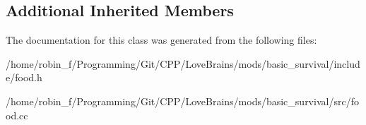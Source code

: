 \subsection*{Additional Inherited Members}


The documentation for this class was generated from the following files\+:\begin{DoxyCompactItemize}
\item 
/home/robin\+\_\+f/\+Programming/\+Git/\+C\+P\+P/\+Love\+Brains/mods/basic\+\_\+survival/include/food.\+h\item 
/home/robin\+\_\+f/\+Programming/\+Git/\+C\+P\+P/\+Love\+Brains/mods/basic\+\_\+survival/src/food.\+cc\end{DoxyCompactItemize}
